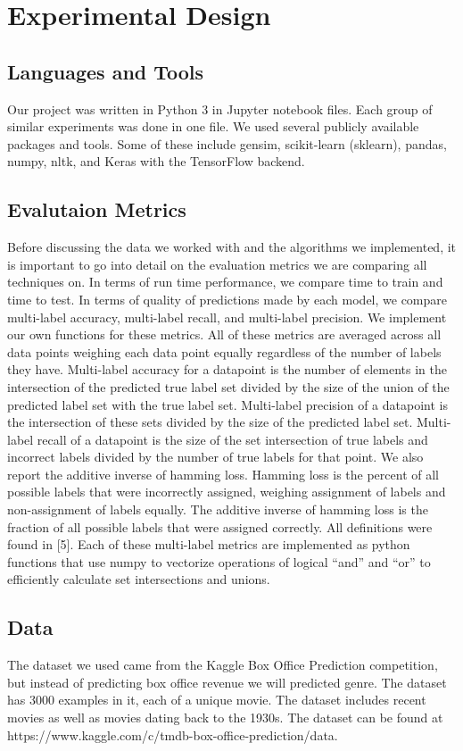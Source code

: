 \documentclass[sigconf]{acmart}
\begin{document}
\section{Experimental Design}
\subsection{Languages and Tools}
Our project was written in Python 3 in Jupyter notebook files.  Each group of similar experiments was done in one file.  We used several publicly available packages and tools.  Some of these include gensim, scikit-learn (sklearn), pandas, numpy, nltk, and Keras with the TensorFlow backend. 

\subsection{Evalutaion Metrics}
Before discussing the data we worked with and the algorithms we implemented, it is important to go into detail on the evaluation metrics we are comparing all techniques on.  In terms of run time performance, we compare time to train and time to test. In terms of quality of predictions made by each model, we compare multi-label accuracy, multi-label recall, and multi-label precision.  We implement our own functions for these metrics. All of these metrics are averaged across all data points weighing each data point equally regardless of the number of labels they have. Multi-label accuracy for a datapoint is the number of elements in the intersection of the predicted true label set divided by the size of the union of the predicted label set with the true label set. Multi-label precision of a datapoint is the intersection of these sets divided by the size of the predicted label set.  Multi-label recall of a datapoint is the size of the set intersection of true labels and incorrect labels divided by the number of true labels for that point. We also report the additive inverse of hamming loss.  Hamming loss is the percent of all possible labels that were incorrectly assigned, weighing assignment of labels and non-assignment of labels equally. The additive inverse of hamming loss is the fraction of all possible labels that were assigned correctly. All definitions were found in [5]. Each of these multi-label metrics are implemented as python functions that use numpy to vectorize operations of logical ``and'' and ``or'' to efficiently calculate set intersections and unions. 

\subsection{Data}
The dataset we used came from the Kaggle Box Office Prediction competition, but instead of predicting box office revenue we will predicted genre.  The dataset has 3000 examples in it, each of a unique movie.  The dataset includes recent movies as well as movies dating back to the 1930s. The dataset can be found at https://www.kaggle.com/c/tmdb-box-office-prediction/data.
\end{document}
